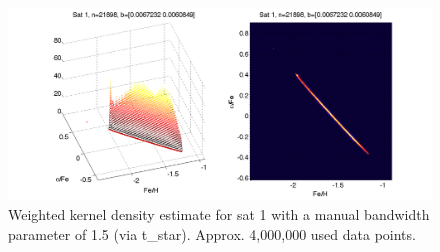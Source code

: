 \documentclass[landscape,12pt]{amsart}
\begin{document}
\begin{figure}
	\begin{center}
		\includegraphics[scale=.5]{wsmooth1_15_4m.png}
	\end{center}
	\caption{Weighted kernel density estimate for sat 1 with a manual bandwidth parameter of 1.5 (via t\_star). Approx. 4,000,000 used data points.}
\end{figure}
\end{document}
